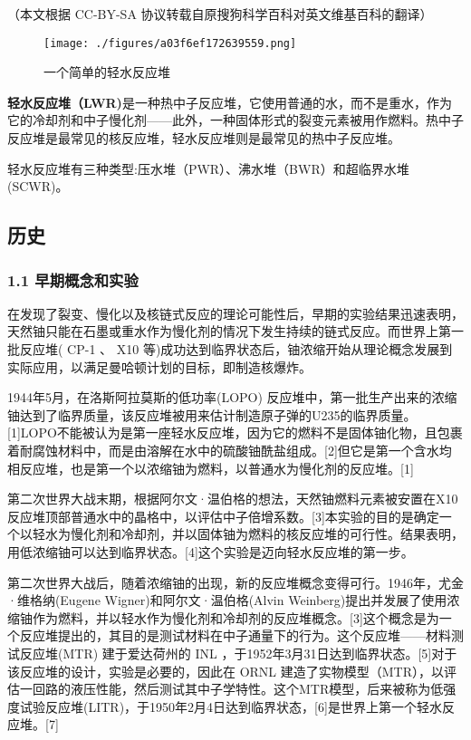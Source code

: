 
（本文根据 CC-BY-SA 协议转载自原搜狗科学百科对英文维基百科的翻译）

\begin{figure}[ht]
\centering
\texttt{[image: ./figures/a03f6ef172639559.png]}
\caption{一个简单的轻水反应堆} \label{fig_QSFYD_7}
\end{figure}

\textbf{轻水反应堆（LWR)}是一种热中子反应堆，它使用普通的水，而不是重水，作为它的冷却剂和中子慢化剂——此外，一种固体形式的裂变元素被用作燃料。热中子反应堆是最常见的核反应堆，轻水反应堆则是最常见的热中子反应堆。

轻水反应堆有三种类型:压水堆（PWR）、沸水堆（BWR）和超临界水堆 (SCWR)。

\subsection{历史}
\subsubsection{1.1 早期概念和实验}
在发现了裂变、慢化以及核链式反应的理论可能性后，早期的实验结果迅速表明，天然铀只能在石墨或重水作为慢化剂的情况下发生持续的链式反应。而世界上第一批反应堆( CP-1 、 X10 等)成功达到临界状态后，铀浓缩开始从理论概念发展到实际应用，以满足曼哈顿计划的目标，即制造核爆炸。

1944年5月，在洛斯阿拉莫斯的低功率(LOPO) 反应堆中，第一批生产出来的浓缩铀达到了临界质量，该反应堆被用来估计制造原子弹的U235的临界质量。[1]LOPO不能被认为是第一座轻水反应堆，因为它的燃料不是固体铀化物，且包裹着耐腐蚀材料中，而是由溶解在水中的硫酸铀酰盐组成。[2]但它是第一个含水均相反应堆，也是第一个以浓缩铀为燃料，以普通水为慢化剂的反应堆。[1]

第二次世界大战末期，根据阿尔文·温伯格的想法，天然铀燃料元素被安置在X10反应堆顶部普通水中的晶格中，以评估中子倍增系数。[3]本实验的目的是确定一个以轻水为慢化剂和冷却剂，并以固体铀为燃料的核反应堆的可行性。结果表明，用低浓缩铀可以达到临界状态。[4]这个实验是迈向轻水反应堆的第一步。

第二次世界大战后，随着浓缩铀的出现，新的反应堆概念变得可行。1946年，尤金·维格纳(Eugene Wigner)和阿尔文·温伯格(Alvin Weinberg)提出并发展了使用浓缩铀作为燃料，并以轻水作为慢化剂和冷却剂的反应堆概念。[3]这个概念是为一个反应堆提出的，其目的是测试材料在中子通量下的行为。这个反应堆——材料测试反应堆(MTR) 建于爱达荷州的 INL ，于1952年3月31日达到临界状态。[5]对于该反应堆的设计，实验是必要的，因此在 ORNL 建造了实物模型（MTR），以评估一回路的液压性能，然后测试其中子学特性。这个MTR模型，后来被称为低强度试验反应堆(LITR)，于1950年2月4日达到临界状态，[6]是世界上第一个轻水反应堆。[7]

